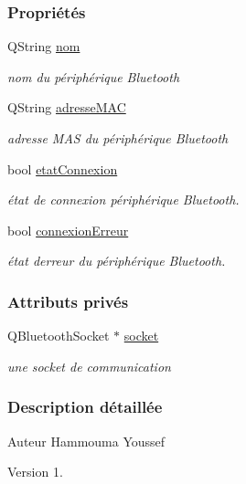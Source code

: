 \subsubsection*{Propriétés}
\begin{DoxyCompactItemize}
\item 
Q\+String \hyperlink{class_peripherique_t_t_p_a_afafe3566b4b5357819811218b9a4244f}{nom}
\begin{DoxyCompactList}\small\item\em nom du périphérique Bluetooth \end{DoxyCompactList}\item 
Q\+String \hyperlink{class_peripherique_t_t_p_a_a444063230c83cf81eff8a3a55736f2cf}{adresse\+M\+AC}
\begin{DoxyCompactList}\small\item\em adresse M\+AS du périphérique Bluetooth \end{DoxyCompactList}\item 
bool \hyperlink{class_peripherique_t_t_p_a_a3aaac9f045cc038777895afe18411e58}{etat\+Connexion}
\begin{DoxyCompactList}\small\item\em état de connexion périphérique Bluetooth. \end{DoxyCompactList}\item 
bool \hyperlink{class_peripherique_t_t_p_a_a9602c4662641984ea44bf6caaac6e94c}{connexion\+Erreur}
\begin{DoxyCompactList}\small\item\em état d\textquotesingle{}erreur du périphérique Bluetooth. \end{DoxyCompactList}\end{DoxyCompactItemize}
\subsubsection*{Attributs privés}
\begin{DoxyCompactItemize}
\item 
Q\+Bluetooth\+Socket $\ast$ \hyperlink{class_peripherique_t_t_p_a_ab66f30984a7f9fa17fd28391efe968a9}{socket}
\begin{DoxyCompactList}\small\item\em une socket de communication \end{DoxyCompactList}\end{DoxyCompactItemize}


\subsubsection{Description détaillée}
\begin{DoxyAuthor}{Auteur}
Hammouma Youssef
\end{DoxyAuthor}
\begin{DoxyVersion}{Version}
1. 
\end{DoxyVersion}


